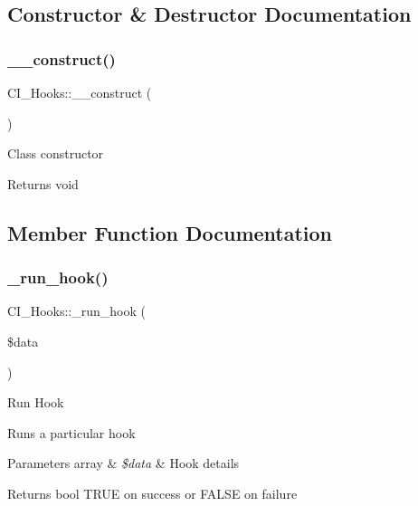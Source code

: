 \subsection{Constructor \& Destructor Documentation}
\mbox{\label{class_c_i___hooks_a69efe7c0d75f0e0106d42ea401cf59ec}} 
\subsubsection{\texorpdfstring{\+\_\+\+\_\+construct()}{\_\_construct()}}
{\footnotesize\ttfamily C\+I\+\_\+\+Hooks\+::\+\_\+\+\_\+construct (\begin{DoxyParamCaption}{ }\end{DoxyParamCaption})}

Class constructor

\begin{DoxyReturn}{Returns}
void 
\end{DoxyReturn}


\subsection{Member Function Documentation}
\mbox{\label{class_c_i___hooks_ac1ac99a9f45cc07eff8434763e066a5d}} 
\subsubsection{\texorpdfstring{\+\_\+run\+\_\+hook()}{\_run\_hook()}}
{\footnotesize\ttfamily C\+I\+\_\+\+Hooks\+::\+\_\+run\+\_\+hook (\begin{DoxyParamCaption}\item[{}]{\$data }\end{DoxyParamCaption})\hspace{0.3cm}{\ttfamily [protected]}}

Run Hook

Runs a particular hook


\begin{DoxyParams}[1]{Parameters}
array & {\em \$data} & Hook details \\
\hline
\end{DoxyParams}
\begin{DoxyReturn}{Returns}
bool T\+R\+UE on success or F\+A\+L\+SE on failure 
\end{DoxyReturn}
\mbox{\label{class_c_i___hooks_aa89ae13d8a7dc735064b70c42db7ef53}} 
